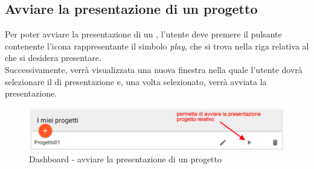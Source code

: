 \subsection{Avviare la presentazione di un progetto}
Per poter avviare la presentazione di un , l'utente deve premere il pulsante contenente l'icona rappresentante il simbolo \textit{play}, che si trova nella riga relativa al  che si desidera presentare.\\ Successivamente, verrà visualizzata una nuova finestra nella quale l'utente dovrà selezionare il  di presentazione e, una volta selezionato, verrà avviata la presentazione.
\begin{figure}[H]
\centering
\includegraphics[scale=0.5]{immagini/imgPresentProg.pdf}
\caption{Dashboard - avviare la presentazione di un progetto}
\end{figure}
